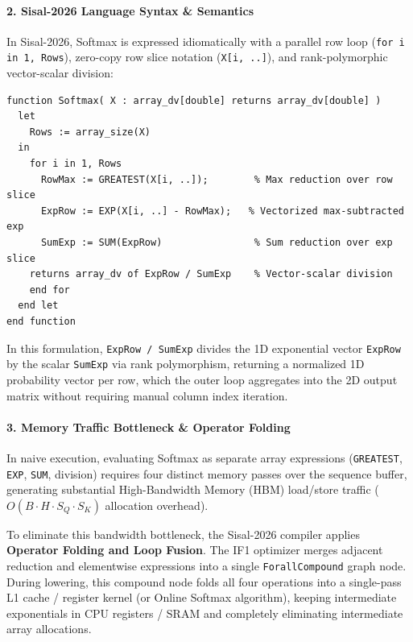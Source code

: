 \paragraph{2. Sisal-2026 Language Syntax \& Semantics}
In Sisal-2026, Softmax is expressed idiomatically with a parallel row loop (\texttt{for i in 1, Rows}), zero-copy row slice notation (\texttt{X[i, ..]}), and rank-polymorphic vector-scalar division:
\begin{lstlisting}[language=Sisal]
function Softmax( X : array_dv[double] returns array_dv[double] )
  let
    Rows := array_size(X)
  in
    for i in 1, Rows
      RowMax := GREATEST(X[i, ..]);        % Max reduction over row slice
      ExpRow := EXP(X[i, ..] - RowMax);   % Vectorized max-subtracted exp
      SumExp := SUM(ExpRow)                % Sum reduction over exp slice
    returns array_dv of ExpRow / SumExp    % Vector-scalar division
    end for
  end let
end function
\end{lstlisting}
In this formulation, \texttt{ExpRow / SumExp} divides the 1D exponential vector \texttt{ExpRow} by the scalar \texttt{SumExp} via rank polymorphism, returning a normalized 1D probability vector per row, which the outer loop aggregates into the 2D output matrix without requiring manual column index iteration.

\paragraph{3. Memory Traffic Bottleneck \& Operator Folding}
In naive execution, evaluating Softmax as separate array expressions (\texttt{GREATEST}, \texttt{EXP}, \texttt{SUM}, division) requires four distinct memory passes over the sequence buffer, generating substantial High-Bandwidth Memory (HBM) load/store traffic ($O(B \cdot H \cdot S_Q \cdot S_K)$ allocation overhead). 

To eliminate this bandwidth bottleneck, the Sisal-2026 compiler applies \textbf{Operator Folding and Loop Fusion}. The IF1 optimizer merges adjacent reduction and elementwise expressions into a single \texttt{ForallCompound} graph node. During lowering, this compound node folds all four operations into a single-pass L1 cache / register kernel (or Online Softmax algorithm), keeping intermediate exponentials in CPU registers / SRAM and completely eliminating intermediate array allocations.

